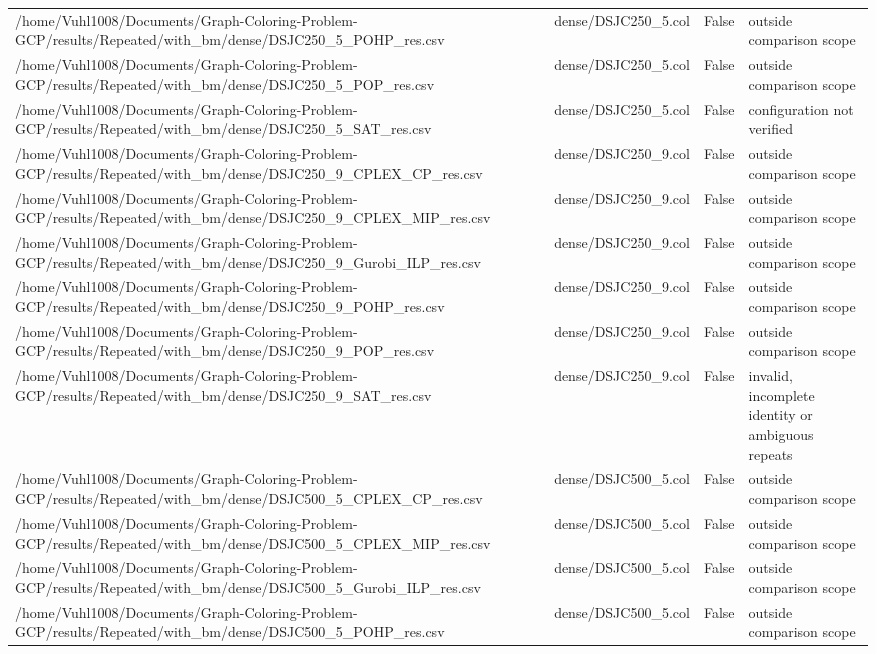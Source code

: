 \begin{table}[htbp]
\begin{tabular}{llll}
/home/Vuhl1008/Documents/Graph-Coloring-Problem-GCP/results/Repeated/with\_bm/dense/DSJC250\_5\_POHP\_res.csv & dense/DSJC250\_5.col & False & outside comparison scope \\
/home/Vuhl1008/Documents/Graph-Coloring-Problem-GCP/results/Repeated/with\_bm/dense/DSJC250\_5\_POP\_res.csv & dense/DSJC250\_5.col & False & outside comparison scope \\
/home/Vuhl1008/Documents/Graph-Coloring-Problem-GCP/results/Repeated/with\_bm/dense/DSJC250\_5\_SAT\_res.csv & dense/DSJC250\_5.col & False & configuration not verified \\
/home/Vuhl1008/Documents/Graph-Coloring-Problem-GCP/results/Repeated/with\_bm/dense/DSJC250\_9\_CPLEX\_CP\_res.csv & dense/DSJC250\_9.col & False & outside comparison scope \\
/home/Vuhl1008/Documents/Graph-Coloring-Problem-GCP/results/Repeated/with\_bm/dense/DSJC250\_9\_CPLEX\_MIP\_res.csv & dense/DSJC250\_9.col & False & outside comparison scope \\
/home/Vuhl1008/Documents/Graph-Coloring-Problem-GCP/results/Repeated/with\_bm/dense/DSJC250\_9\_Gurobi\_ILP\_res.csv & dense/DSJC250\_9.col & False & outside comparison scope \\
/home/Vuhl1008/Documents/Graph-Coloring-Problem-GCP/results/Repeated/with\_bm/dense/DSJC250\_9\_POHP\_res.csv & dense/DSJC250\_9.col & False & outside comparison scope \\
/home/Vuhl1008/Documents/Graph-Coloring-Problem-GCP/results/Repeated/with\_bm/dense/DSJC250\_9\_POP\_res.csv & dense/DSJC250\_9.col & False & outside comparison scope \\
/home/Vuhl1008/Documents/Graph-Coloring-Problem-GCP/results/Repeated/with\_bm/dense/DSJC250\_9\_SAT\_res.csv & dense/DSJC250\_9.col & False & invalid, incomplete identity or ambiguous repeats \\
/home/Vuhl1008/Documents/Graph-Coloring-Problem-GCP/results/Repeated/with\_bm/dense/DSJC500\_5\_CPLEX\_CP\_res.csv & dense/DSJC500\_5.col & False & outside comparison scope \\
/home/Vuhl1008/Documents/Graph-Coloring-Problem-GCP/results/Repeated/with\_bm/dense/DSJC500\_5\_CPLEX\_MIP\_res.csv & dense/DSJC500\_5.col & False & outside comparison scope \\
/home/Vuhl1008/Documents/Graph-Coloring-Problem-GCP/results/Repeated/with\_bm/dense/DSJC500\_5\_Gurobi\_ILP\_res.csv & dense/DSJC500\_5.col & False & outside comparison scope \\
/home/Vuhl1008/Documents/Graph-Coloring-Problem-GCP/results/Repeated/with\_bm/dense/DSJC500\_5\_POHP\_res.csv & dense/DSJC500\_5.col & False & outside comparison scope \\

\end{tabular}
\end{table}
